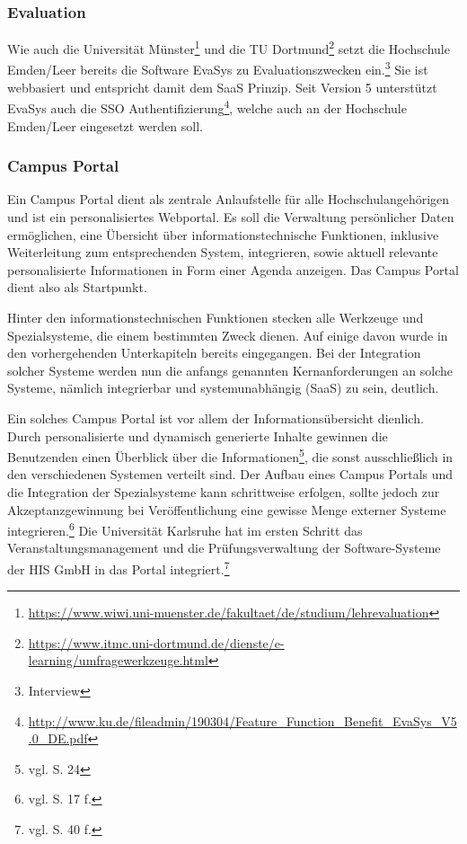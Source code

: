 \subsubsection{Evaluation}
Wie auch die Universität Münster\footnote{\url{https://www.wiwi.uni-muenster.de/fakultaet/de/studium/lehrevaluation}} und die TU Dortmund\footnote{\url{https://www.itmc.uni-dortmund.de/dienste/e-learning/umfragewerkzeuge.html}} setzt die Hochschule Emden/Leer bereits die Software EvaSys zu Evaluationszwecken ein.\footnote{Interview} Sie ist webbasiert und entspricht damit dem SaaS Prinzip.
Seit Version 5 unterstützt EvaSys auch die SSO Authentifizierung\footnote{\url{http://www.ku.de/fileadmin/190304/Feature_Function_Benefit_EvaSys_V5.0_DE.pdf}}, welche auch an der Hochschule Emden/Leer eingesetzt werden soll.

\subsubsection{Campus Portal}
Ein Campus Portal dient als zentrale Anlaufstelle für alle Hochschulangehörigen und ist ein personalisiertes Webportal. Es soll die Verwaltung persönlicher Daten ermöglichen, eine Übersicht über informationstechnische Funktionen, inklusive Weiterleitung zum entsprechenden System, integrieren, sowie aktuell relevante personalisierte Informationen in Form einer Agenda anzeigen. Das Campus Portal dient also als Startpunkt.

Hinter den informationstechnischen Funktionen stecken alle Werkzeuge und Spezialsysteme, die einem bestimmten Zweck dienen. Auf einige davon wurde in den vorhergehenden Unterkapiteln bereits eingegangen. Bei der Integration solcher Systeme werden nun die anfangs genannten Kernanforderungen an solche Systeme, nämlich integrierbar und systemunabhängig (SaaS) zu sein, deutlich.

Ein solches Campus Portal ist vor allem der Informationsübersicht dienlich. Durch personalisierte und dynamisch generierte Inhalte gewinnen die Benutzenden einen Überblick über die Informationen\footnote{vgl. \cite{dini_webportale_2007} S. 24}, die sonst ausschließlich in den verschiedenen Systemen verteilt sind. Der Aufbau eines Campus Portals und die Integration der Spezialsysteme kann schrittweise erfolgen, sollte jedoch zur Akzeptanzgewinnung bei Veröffentlichung eine gewisse Menge externer Systeme integrieren.\footnote{vgl. \cite{dini_webportale_2007} S. 17 f.} Die Universität Karlsruhe hat im ersten Schritt das Veranstaltungsmanagement und die Prüfungsverwaltung der Software-Systeme der HIS GmbH in das Portal integriert.\footnote{vgl. \cite{dini_webportale_2007} S. 40 f.}

